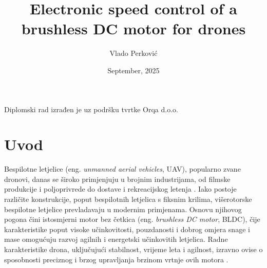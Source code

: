 \documentclass[diplomskirad]{fer}
\title{Electronic speed control of a brushless DC motor for drones}
\author{Vlado Perković}
\date{September, 2025}
\begin{document}
\maketitle




\begin{zahvale}
	Diplomski rad izrađen je uz podršku tvrtke Orqa d.o.o.
\end{zahvale}

\mainmatter

\tableofcontents
\newpage

\chapter{Uvod}
\label{pog:uvod}

Bespilotne letjelice (eng. \textit{unmanned aerial vehicles}, UAV), popularno
zvane dronovi, danas se široko primjenjuju u brojnim industrijama, od filmske
produkcije i poljoprivrede do dostave i rekreacijskog letenja
\cite{cite:primjena}. Iako postoje različite konstrukcije, poput bespilotnih
letjelica s fiksnim krilima, višerotorske bespilotne letjelice prevladavaju u
modernim primjenama. Osnovu njihovog pogona čini istosmjerni motor bez četkica
(eng. \textit{brushless DC motor}, BLDC), čije karakteristike poput visoke
učinkovitosti, pouzdanosti i dobrog omjera snage i mase omogućuju razvoj
agilnih i energetski učinkovitih letjelica. Radne karakteristike drona,
uključujući stabilnost, vrijeme leta i agilnost, izravno ovise o sposobnosti
preciznog i brzog upravljanja brzinom vrtnje ovih motora
\cite{cite:karakteristike_motora}.

\end{document}
